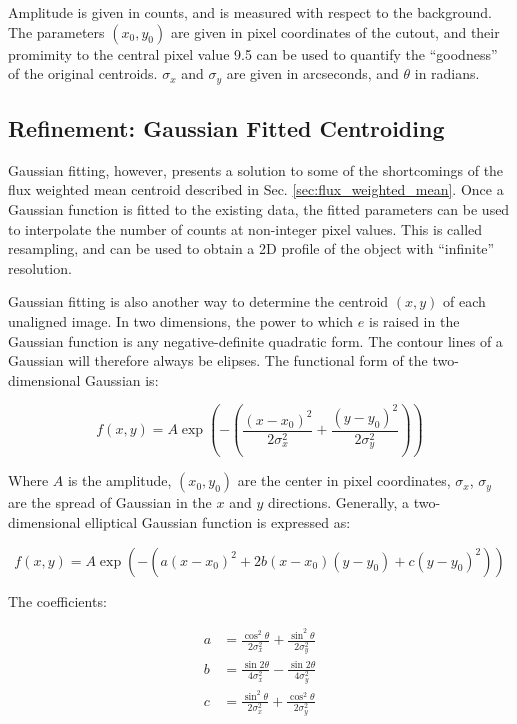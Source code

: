 \documentclass[a4paper,11pt]{article}
\begin{document}
Amplitude is given in counts, and is measured with respect to the background. The parameters $(x_0,y_0)$ are given in pixel coordinates of the cutout, and their promimity to the central pixel value 9.5 can be used to quantify the ``goodness'' of the original centroids. $\sigma_x$ and $\sigma_y$ are given in arcseconds, and $\theta$ in radians.

\subsection{Refinement: Gaussian Fitted Centroiding}

Gaussian fitting, however, presents a solution to some of the shortcomings of the flux weighted mean centroid described in Sec. \ref{sec:flux_weighted_mean}. Once a Gaussian function is fitted to the existing data, the fitted parameters can be used to interpolate the number of counts at non-integer pixel values. This is called resampling, and can be used to obtain a 2D profile of the object with ``infinite'' resolution.

Gaussian fitting is also another way to determine the centroid $(x,y)$ of each unaligned image. In two dimensions, the power to which $e$ is raised in the Gaussian function is any negative-definite quadratic form. The contour lines of a Gaussian will therefore always be elipses.\cite{astropy_gaussian} The functional form of the two-dimensional Gaussian is:

\begin{equation}
    f(x,y) = A \exp\left(- \left(\frac{(x-x_0)^2}{2\sigma_x^2} + \frac{(y-y_0)^2}{2\sigma_y^2} \right)\right)
\end{equation}

\noindent Where $A$ is the amplitude, $(x_0, y_0)$ are the center in pixel coordinates, $\sigma_x$, $\sigma_y$ are the spread of Gaussian in the $x$ and $y$ directions.\cite{wolfram_gaussian} Generally, a two-dimensional elliptical Gaussian function is expressed as:

\begin{equation}
    f(x,y) = A \exp\left(- \left(a(x - x_0)^2 + 2b(x-x_0)(y-y_0) + c(y-y_0)^2 \right)\right)
\end{equation}

\noindent The coefficients:

\begin{align}
a & = \frac{\cos^2\theta}{2\sigma_x^2} + \frac{\sin^2\theta}{2\sigma_y^2} \\
b & = \frac{\sin2\theta}{4\sigma_x^2} - \frac{\sin2\theta}{4\sigma_y^2} \\
c & = \frac{\sin^2\theta}{2\sigma_x^2} + \frac{\cos^2\theta}{2\sigma_y^2}
\end{align}
\end{document}
